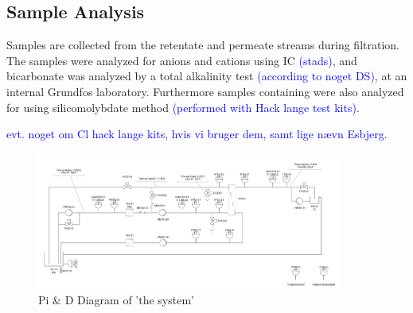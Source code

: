 \subsection{Sample Analysis}
Samples are collected from the retentate and permeate streams during filtration.
The samples were analyzed for anions and cations using IC \textcolor{blue}{(stads)}, and bicarbonate was analyzed by a total alkalinity test \textcolor{blue}{(according to noget DS)}, at an internal Grundfos laboratory.                                     
Furthermore samples containing  were also analyzed for  using silicomolybdate method \textcolor{blue}{(performed with Hack lange test kits)}. 

\textcolor{blue}{evt. noget om Cl hack lange kits, hvis vi bruger dem, samt lige nævn Esbjerg. }
\begin{figure}[h]
    \centering
    \includegraphics[width=0.9\textwidth]{Billeder/exp/PID.png}
    \caption{Pi \& D Diagram of 'the system'}
    \label{fig:PID_system}
\end{figure}










